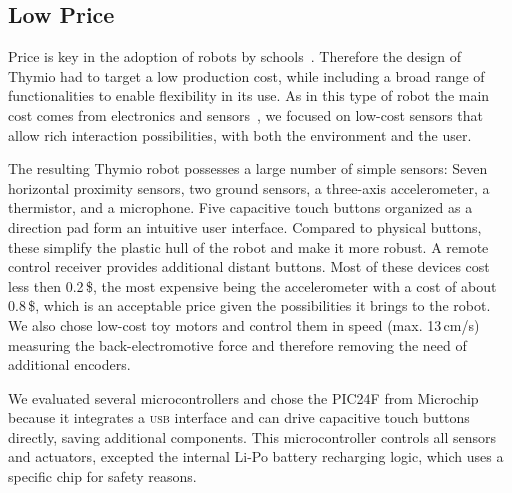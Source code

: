 \documentclass[letterpaper, 10 pt, conference]{ieeeconf}  %
\begin{document}
\subsection{Low Price}

Price is key in the adoption of robots by schools~\cite{kradolfer2014sociological}.
Therefore the design of Thymio had to target a low production cost, while including a broad range of functionalities to enable flexibility in its use. 
As in this type of robot the main cost comes from electronics and sensors~\cite{thesis_michael}, we focused on low-cost sensors that allow rich interaction possibilities, with both the environment and the user.

The resulting Thymio robot possesses a large number of simple sensors:
Seven horizontal proximity sensors, two ground sensors, a three-axis accelerometer, a thermistor, and a microphone.
Five capacitive touch buttons organized as a direction pad form an intuitive user interface.
Compared to physical buttons, these simplify the plastic hull of the robot and make it more robust.
A remote control receiver provides additional distant buttons.
Most of these devices cost less then 0.2\,\$, the most expensive being the accelerometer with a cost of about 0.8\,\$, which is an acceptable price given the possibilities it brings to the robot.
We also chose low-cost toy motors and control them in speed (max. 13\,cm/s) measuring the back-electromotive force and therefore removing the need of additional encoders.

We evaluated several microcontrollers and chose the PIC24F from Microchip because it integrates a \textsc{usb} interface and can drive capacitive touch buttons directly, saving additional components. 
This microcontroller controls all sensors and actuators, excepted the internal Li-Po battery recharging logic, which uses a specific chip for safety reasons.
\end{document}
